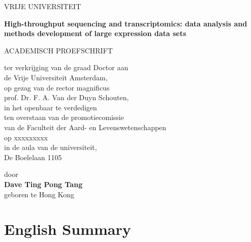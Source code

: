\documentclass[10pt,a4paper]{report}
\begin{document}
\begin{titlepage}
   \begin{center}
      VRIJE UNIVERSITEIT

      \vspace{1.5cm}

      \fontsize{17}{1em}\selectfont \textbf{High-throughput sequencing and transcriptomics: data analysis and methods development of large expression data sets}

      \vspace{3cm}

      \fontsize{11}{1em}\selectfont
ACADEMISCH PROEFSCHRIFT

      \vspace{8mm}

ter verkrijging van de graad Doctor aan \\
de Vrije Universiteit Amsterdam, \\
op gezag van de rector magnificus \\
prof. Dr. F. A. Van der Duyn Schouten, \\
in het openbaar te verdedigen \\
ten overstaan van de promotiecomissie \\
van de Faculteit der Aard- en Levenswetenschappen \\
op xxxxxxxxx \\
in de aula van de universiteit, \\
De Boelelaan 1105 \\

      \vfill

      \normalsize
      door \\

      \fontsize{16}{2em}\selectfont \textbf{Dave Ting Pong Tang} \\
      \normalsize
      \vspace{1mm}
      geboren te Hong Kong

   \end{center}
\end{titlepage}

\chapter*{}


\chapter*{English Summary}
\small

\end{document}

